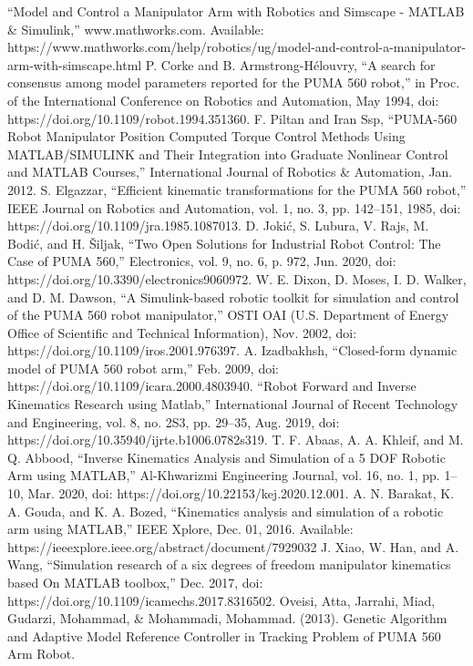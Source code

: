 \documentclass[conference]{IEEEtran}
\begin{document}
\begin{thebibliography}{00}
     ``Model and Control a Manipulator Arm with Robotics and Simscape - MATLAB \& Simulink,'' www.mathworks.com. Available: https://www.mathworks.com/help/robotics/ug/model-and-control-a-manipulator-arm-with-simscape.html
     P. Corke and B. Armstrong-Hélouvry, ``A search for consensus among model parameters reported for the PUMA 560 robot,'' in Proc. of the International Conference on Robotics and Automation, May 1994, doi: https://doi.org/10.1109/robot.1994.351360.
     F. Piltan and Iran Ssp, ``PUMA-560 Robot Manipulator Position Computed Torque Control Methods Using MATLAB/SIMULINK and Their Integration into Graduate Nonlinear Control and MATLAB Courses,'' International Journal of Robotics \& Automation, Jan. 2012.
     S. Elgazzar, ``Efficient kinematic transformations for the PUMA 560 robot,'' IEEE Journal on Robotics and Automation, vol. 1, no. 3, pp. 142–151, 1985, doi: https://doi.org/10.1109/jra.1985.1087013.
     D. Jokić, S. Lubura, V. Rajs, M. Bodić, and H. Šiljak, ``Two Open Solutions for Industrial Robot Control: The Case of PUMA 560,'' Electronics, vol. 9, no. 6, p. 972, Jun. 2020, doi: https://doi.org/10.3390/electronics9060972.
     W. E. Dixon, D. Moses, I. D. Walker, and D. M. Dawson, ``A Simulink-based robotic toolkit for simulation and control of the PUMA 560 robot manipulator,'' OSTI OAI (U.S. Department of Energy Office of Scientific and Technical Information), Nov. 2002, doi: https://doi.org/10.1109/iros.2001.976397.
     A. Izadbakhsh, ``Closed-form dynamic model of PUMA 560 robot arm,'' Feb. 2009, doi: https://doi.org/10.1109/icara.2000.4803940.
     ``Robot Forward and Inverse Kinematics Research using Matlab,'' International Journal of Recent Technology and Engineering, vol. 8, no. 2S3, pp. 29–35, Aug. 2019, doi: https://doi.org/10.35940/ijrte.b1006.0782s319.
     T. F. Abaas, A. A. Khleif, and M. Q. Abbood, ``Inverse Kinematics Analysis and Simulation of a 5 DOF Robotic Arm using MATLAB,'' Al-Khwarizmi Engineering Journal, vol. 16, no. 1, pp. 1–10, Mar. 2020, doi: https://doi.org/10.22153/kej.2020.12.001.
     A. N. Barakat, K. A. Gouda, and K. A. Bozed, ``Kinematics analysis and simulation of a robotic arm using MATLAB,'' IEEE Xplore, Dec. 01, 2016. Available: https://ieeexplore.ieee.org/abstract/document/7929032
     J. Xiao, W. Han, and A. Wang, ``Simulation research of a six degrees of freedom manipulator kinematics based On MATLAB toolbox,'' Dec. 2017, doi: https://doi.org/10.1109/icamechs.2017.8316502.
     Oveisi, Atta, Jarrahi, Miad, Gudarzi, Mohammad, \& Mohammadi, Mohammad. (2013). Genetic Algorithm and Adaptive Model Reference Controller in Tracking Problem of PUMA 560 Arm Robot.
\end{thebibliography}    
\vspace{12pt}
\color{red}
\end{document}
